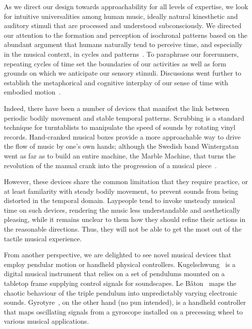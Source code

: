 \documentclass{nime-alternate} %
\begin{document}
As we direct our design towards approachability for all levels of expertise, we look for intuitive universalities among human music, ideally natural kinesthetic and auditory stimuli that are processed and understood subconsciously. We directed our attention to the formation and perception of isochronal patterns based on the abundant argument that humans naturally tend to perceive time, and especially in the musical context, in cycles and patterns~\cite{Brower:Cog, Neisser_1976, Ravignani2016}. To paraphrase our forerunners, repeating cycles of time set the boundaries of our activities as well as form grounds on which we anticipate our sensory stimuli. Discussions went further to establish the metaphorical and cognitive interplay of our sense of time with embodied motion~\cite{Johnson_Larson_2003, Johnson_2008}.

Indeed, there have been a number of devices that manifest the link between periodic bodily movement and stable temporal patterns. Scrubbing is a standard technique for turntablists to manipulate the speed of sounds by rotating vinyl records. Hand-cranked musical boxes provide a more approachable way to drive the flow of music by one's own hands; although the Swedish band Wintergatan went as far as to build an entire machine, the Marble Machine, that turns the revolution of the manual crank into the progression of a musical piece~\cite{Rundle_Woollaston-Webber_2017}.

However, these devices share the common limitation that they require practice, or at least familarity with steady bodily movement, to prevent sounds from being distorted in the temporal domain. Laypeople tend to invoke unsteady musical time on such devices, rendering the music less understandable and aesthetically pleasing, while it remains unclear to them how they should refine their actions in the reasonable directions. Thus, they will not be able to get the most out of the tactile musical experience.

From another perspective, we are delighted to see novel musical devices that employ pendular motion or handheld physical controllers. Kugelschwung~\cite{Kugelschwung} is a digital musical instrument that relies on a set of pendulums mounted on a tabletop frame supplying control signals for soundscapes. Le Bâton~\cite{LeBaton} maps the chaotic behaviour of the triple pendulum into unpredictably varying electronic sounds. Gyrotyre~\cite{Gyrotyre}, on the other hand (no pun intended), is a handheld controller that maps oscillating signals from a gyroscope installed on a precessing wheel to various musical applications.
\end{document}
